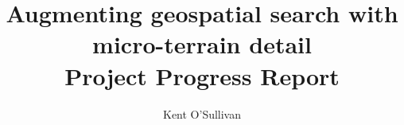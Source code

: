 \documentclass[sigconf]{acmart}
\begin{document}

\renewcommand{\shortauthors}{O'Sullivan}

\graphicspath{ {figures/}{auto_commit_fig/}{auto_fig/} }

\newcommand{\latexfile}[1]{}





\title{Augmenting geospatial search with micro-terrain detail\\ \Large Project Progress Report}

\author{Kent O'Sullivan}

\begin{abstract}
\latexfile{00_Abstract.tex}
\end{abstract}

\maketitle


\latexfile{10_Introduction.tex}
\clearpage
\latexfile{20_Datasets.tex}
\clearpage
\latexfile{30_Architecture.tex}
\clearpage
\latexfile{40_Implementation.tex}
\clearpage
\latexfile{50_Results.tex}
\clearpage
\latexfile{60_Related.tex}
\clearpage
\latexfile{70_Limitations.tex}
\clearpage
\latexfile{80_Conclusion.tex}


 \label{bibliography}
\end{document}

